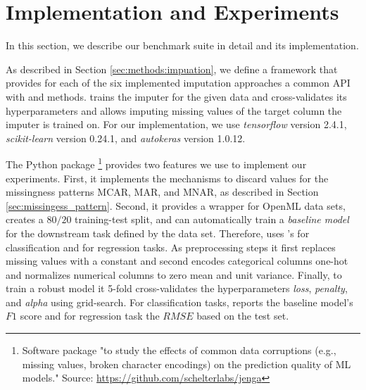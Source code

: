 \section{Implementation and Experiments}
%
In this section, we describe our benchmark suite in detail and its implementation.

As described in Section \ref{sec:methods:impuation}, we define a framework that provides for each of the six implemented imputation approaches a common API with  and  methods.  trains the imputer for the given data and cross-validates its hyperparameters and  allows imputing missing values of the target column the imputer is trained on. For our implementation, we use \emph{tensorflow} version 2.4.1, \emph{scikit-learn} version 0.24.1, and \emph{autokeras} version 1.0.12.

The Python package \footnote{Software package "to study the effects of common data corruptions (e.g., missing values, broken character encodings) on the prediction quality of ML models." Source: \url{https://github.com/schelterlabs/jenga}} \citep{Jenga} provides two features we use to implement our experiments. First, it implements the mechanisms to discard values for the missingness patterns MCAR, MAR, and MNAR, as described in Section \ref{sec:missingess_pattern}. Second, it provides a wrapper for OpenML data sets, creates a $80/20$ training-test split, and can automatically train a \emph{baseline model} for the downstream task defined by the data set. Therefore,  uses 's  for classification and  for regression tasks. As preprocessing steps it first replaces missing values with a constant and second encodes categorical columns one-hot and normalizes numerical columns to zero mean and unit variance. Finally, to train a robust model it 5-fold cross-validates the hyperparameters \emph{loss}, \emph{penalty}, and \emph{alpha} using grid-search. For classification tasks,  reports the baseline model's $F1$ score and for regression task the $RMSE$ based on the test set.


